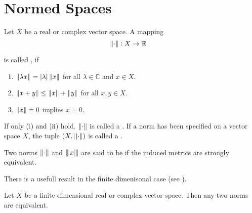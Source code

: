 \section{Normed Spaces}

\begin{definition}
	Let $X$ be a real or complex vector space. A mapping 
	\begin{equation}
		\norm[0]{\cdot}: X \to \mathbb{R}
	\end{equation}

	\noindent is called , if

	\begin{enumerate}
		\item $\norm[0]{\lambda x} = \abs[0]{\lambda}\norm[0]{x}$ for all $\lambda \in \mathbb{C}$ and $x \in X$.
		\item $\norm[0]{x + y} \leq \norm[0]{x} + \norm[0]{y}$ for all $x,y \in X$.
		\item $\norm[0]{x} = 0$ implies $x = 0$.
	\end{enumerate}

	If only \textup{(}i\textup{)} and \textup{(}ii\textup{)} hold, $\norm[0]{\cdot}$ is called a . If a norm has been specified on a vector space $X$, the tuple $(X,\norm[0]{\cdot})$ is called a .
\end{definition}

\begin{definition}
	Two norms $\norm[0]{\cdot}$ and $\trinorm[0]{x}$ are said to be  if the induced metrics are strongly equivalent.
\end{definition}

There is a usefull result in the finite dimenisonal case (see \cite[26]{werner:funktionalanalysis:2011}).

\begin{theorem}
	Let $X$ be a finite dimensional real or complex vector space. Then any two norms are equivalent.	
\end{theorem}

